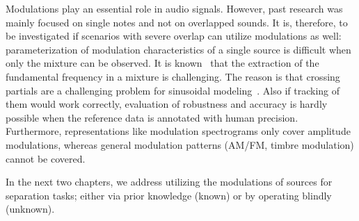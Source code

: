 Modulations play an essential role in audio signals. 
However, past research was mainly focused on single notes and not on overlapped sounds.
It is, therefore, to be investigated if scenarios with severe overlap can utilize modulations as well: parameterization of modulation characteristics of a single source is difficult when only the mixture can be observed. 
It is known~\cite{salamon13} that the extraction of the fundamental frequency in a mixture is challenging. 
The reason is that crossing partials are a challenging problem for sinusoidal modeling~\cite{viste03}. 
Also if tracking of them would work correctly, evaluation of robustness and accuracy is hardly possible when the reference data is annotated with human precision.
Furthermore, representations like modulation spectrograms only cover amplitude modulations, whereas general modulation patterns (AM/FM, timbre modulation) cannot be covered.
\par
In the next two chapters, we address utilizing the modulations of sources for separation tasks; either via prior knowledge (known) or by operating blindly (unknown).